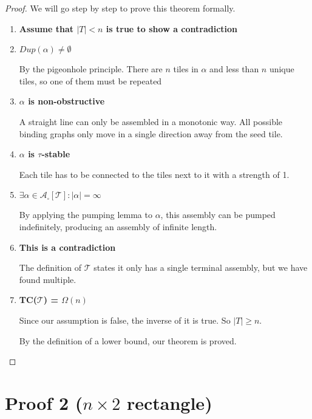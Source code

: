 \documentclass[12pt]{article}
\begin{document}
\begin{proof}
	We will go step by step to prove this theorem formally.

	\begin{enumerate}
		\item \textbf{Assume that $|T| < n$ is true to show a contradiction}

		\item \textbf{$Dup(\alpha) \neq \emptyset$}

		By the pigeonhole principle. There are $n$ tiles in $\alpha$ and less than $n$ unique tiles, so one of them must be repeated

		\item \textbf{$\alpha$ is non-obstructive}

            A straight line can only be assembled in a monotonic way. All possible binding graphs only move in a single direction away from the seed tile.

        \item \textbf{$\alpha$ is $\tau$-stable}

            Each tile has to be connected to the tiles next to it with a strength of 1. 


		\item \textbf{$\exists \alpha \in \mathcal{A}_\square[\mathcal{T}] : |\alpha| = \infty $}

            By applying the pumping lemma to $\alpha$, this assembly can be pumped indefinitely, producing an assembly of infinite length.

		\item \textbf{This is a contradiction}

		The definition of $\mathcal{T}$ states it only has a single terminal assembly, but we have found multiple.

		\item \textbf{TC($\mathcal{T}$) = $\Omega(n)$}

		Since our assumption is false, the inverse of it is true. So $|T| \geq n$.

		By the definition of a lower bound, our theorem is proved.

	\end{enumerate}
\end{proof}

\section*{Proof 2 ($n \times 2 $ rectangle)}
\end{document}
